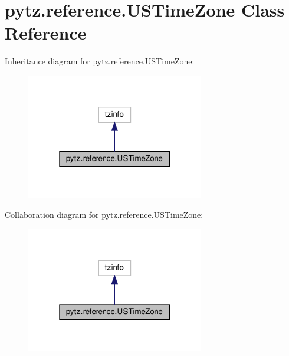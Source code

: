 \hypertarget{classpytz_1_1reference_1_1USTimeZone}{}\section{pytz.\+reference.\+U\+S\+Time\+Zone Class Reference}
\label{classpytz_1_1reference_1_1USTimeZone}


Inheritance diagram for pytz.\+reference.\+U\+S\+Time\+Zone\+:
\nopagebreak
\begin{figure}[H]
\begin{center}
\leavevmode
\includegraphics[width=220pt]{classpytz_1_1reference_1_1USTimeZone__inherit__graph}
\end{center}
\end{figure}


Collaboration diagram for pytz.\+reference.\+U\+S\+Time\+Zone\+:
\nopagebreak
\begin{figure}[H]
\begin{center}
\leavevmode
\includegraphics[width=220pt]{classpytz_1_1reference_1_1USTimeZone__coll__graph}
\end{center}
\end{figure}

